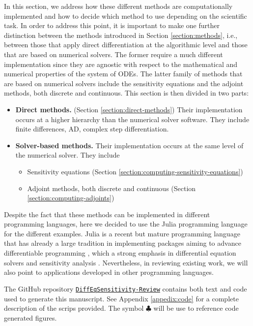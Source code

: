
In this section, we address how these different methods are computationally implemented and how to decide which method to use depending on the scientific task.
In order to address this point, it is important to make one further distinction between the methods introduced in Section \ref{section:methods}, i.e., between those that apply direct differentiation at the algorithmic level and those that are based on numerical solvers.  
The former require a much different implementation since they are agnostic with respect to the mathematical and numerical properties of the system of ODEs.
The latter family of methods that are based on numerical solvers include the sensitivity equations and the adjoint methods, both discrete and continuous.
This section is then divided in two parts:
\begin{itemize}
    \item \textbf{Direct methods.} (Section \ref{section:direct-methods}) Their implementation occurs at a higher hierarchy than the numerical solver software. They include finite differences, AD, complex step differentiation.
    \item \textbf{Solver-based methods.} Their implementation occurs at the same level of the numerical solver. They include 
    \begin{itemize}
        \item Sensitivity equations (Section \ref{section:computing-sensitivity-equations})
        \item Adjoint methods, both discrete and continuous (Section \ref{section:computing-adjoints})
    \end{itemize}
\end{itemize}
Despite the fact that these methods can be implemented in different programming languages, here we decided to use the Julia programming language for the different examples. 
Julia is a recent but mature programming language that has already a large tradition in implementing packages aiming to advance differentiable programming \cite{Bezanson_Karpinski_Shah_Edelman_2012, Julialang_2017}, which a strong emphasis in differential equation solvers \cite{Rackauckas_Nie_2016} and sensitivity analysis \cite{rackauckas2020universal}.
Nevertheless, in reviewing existing work, we will also point to applications developed in other programming languages.

The GitHub repository \href{https://github.com/ODINN-SciML/DiffEqSensitivity-Review}{\texttt{DiffEqSensitivity-Review}} contains both text and code used to generate this manuscript. 
See Appendix \ref{appedix:code} for a complete description of the scrips provided. 
The symbol $\clubsuit$ will be use to reference code generated figures. 